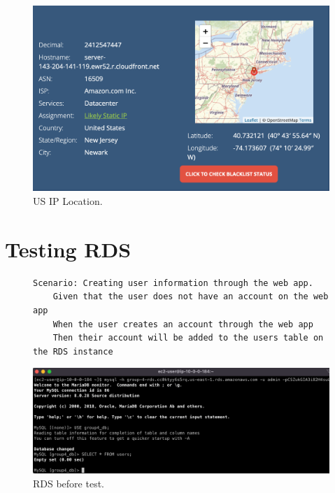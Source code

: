\begin{figure}[!htbp]
    \centering
    \includegraphics[width=\textwidth]{resources/cloudfront/cloudfront-test-us-ip}
    \caption{US IP Location.}
    \label{fig:cloudfront-test-us-ip}
\end{figure}

\clearpage
\section{Testing RDS}\label{sec:testing-rds}
\begin{figure}[!htbp]
    \centering
    \begin{verbatim}
Scenario: Creating user information through the web app.
    Given that the user does not have an account on the web app
    When the user creates an account through the web app
    Then their account will be added to the users table on the RDS instance
    \end{verbatim}
    \label{fig:create-user-data}
\end{figure}

\begin{figure}[!htbp]
    \centering
    \includegraphics[width=\textwidth]{resources/rds/rds-testing-empty}
    \caption{RDS before test.}
    \label{fig:rds-testing-empty}
\end{figure}

